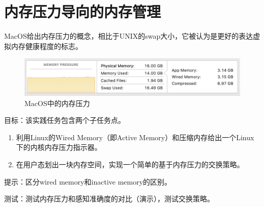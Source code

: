 \section{内存压力导向的内存管理}
MacOS给出内存压力的概念，相比于UNIX的swap大小，它被认为是更好的表达虚拟内存健康程度的标志。

\begin{figure}[h]
    \centering
    \includegraphics[width=0.8\linewidth]{figure/mixed-figures/memory-pressure.png}
    \caption{MacOS中的内存压力}
    \label{fig:enter-label}
\end{figure}

目标：该实践任务包含两个子任务点。
\begin{enumerate}
    \item 利用Linux的Wired Memory（即Active Memory）和压缩内存给出一个Linux下的内核内存压力指示器。
    \item 在用户态划出一块内存空间，实现一个简单的基于内存压力的交换策略。
\end{enumerate}


提示：区分wired memory和inactive memory的区别。

测试：测试内存压力和感知准确度的对比（演示），测试交换策略。
